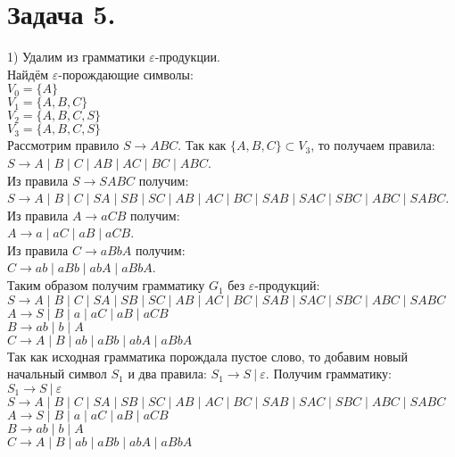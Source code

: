 \documentclass[12pt]{article}
\theoremstyle{definition}
\theoremstyle{definition}
\let\ra\rightarrow
\let\epsilon\varepsilon
\begin{document}
\section*{Задача 5.}
1) Удалим из грамматики $\epsilon$-продукции.\\
Найдём $\epsilon$-порождающие символы:\\
$V_0 = \{A\}$\\
$V_1 = \{A, B, C\}$\\
$V_2 = \{A,B,C,S\}$\\
$V_3 = \{A,B,C,S\}$\\
Рассмотрим правило $S \ra ABC$. Так как $\{A,B,C\} \subset V_3$, то получаем правила:\\
\hspace*{0,5cm}$S \ra A \mid B \mid C \mid AB \mid AC \mid BC \mid ABC$.\\
Из правила $S \ra SABC$ получим:\\
\hspace*{0,5cm}$S \ra A \mid B \mid C \mid SA \mid SB \mid SC \mid AB \mid AC \mid BC \mid SAB \mid SAC \mid SBC \mid ABC \mid SABC$.\\
Из правила $A \ra aCB$ получим:\\
\hspace*{0,5cm}$A \ra a \mid aC \mid aB \mid aCB$.\\
Из правила $C \ra aBbA$ получим:\\
\hspace*{0,5cm}$C \ra ab \mid aBb \mid abA \mid aBbA$.\\
\hspace*{0,5cm} Таким образом получим грамматику $G_1$ без $\epsilon$-продукций:\\
$S \ra A \mid B \mid C \mid SA \mid SB \mid SC \mid AB \mid AC \mid BC \mid SAB \mid SAC \mid SBC \mid ABC \mid SABC$\\
$A \ra S \mid B \mid a \mid aC \mid aB \mid aCB$\\
$B \ra ab \mid b \mid A$\\
$C \ra A \mid B \mid ab \mid aBb \mid abA \mid aBbA$\\

Так как исходная грамматика порождала пустое слово, то добавим новый начальный символ $S_1$ и два правила: $S_1 \ra S\ |\ \epsilon$. Получим грамматику: \\
$S_1 \ra S\ |\ \epsilon$\\
$S \ra A \mid B \mid C \mid SA \mid SB \mid SC \mid AB \mid AC \mid BC \mid SAB \mid SAC \mid SBC \mid ABC \mid SABC$\\
$A \ra S \mid B \mid a \mid aC \mid aB \mid aCB$\\
$B \ra ab \mid b \mid A$\\
$C \ra A \mid B \mid ab \mid aBb \mid abA \mid aBbA$\\
\end{document}
